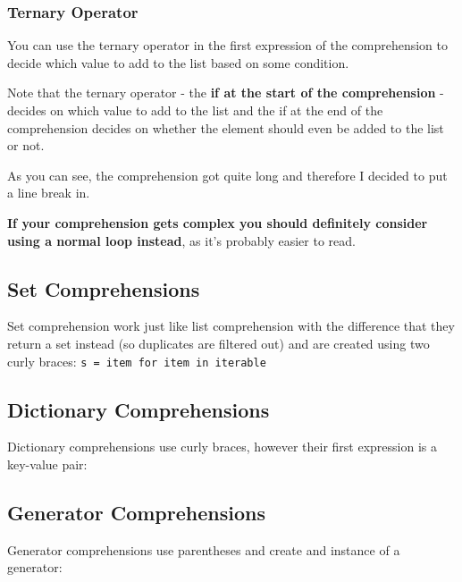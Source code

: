         \subsubsection{Ternary Operator}

            You can use the ternary operator in the first expression of the comprehension to decide
            which value to add to the list based on some condition.

            Note that the ternary operator - the \textbf{if at the start of the comprehension} -
            decides on which value to add to the list and the if at the end of the comprehension
            decides on whether the element should even be added to the list or not.


            As you can see, the comprehension got quite long and therefore I decided to put
            a line break in.

            \textbf{If your comprehension gets complex you should definitely consider using a normal loop
            instead}, as it's probably easier to read.

    \subsection{Set Comprehensions}

        Set comprehension work just like list comprehension with the difference that they return a
        set instead (so duplicates are filtered out) and are created using two curly braces:
        \texttt{s = {item for item in iterable}}

    \subsection{Dictionary Comprehensions}

        Dictionary comprehensions use curly braces, however their first expression is a key-value
        pair:


    \subsection{Generator Comprehensions}

        Generator comprehensions use parentheses and create and instance of a generator:

